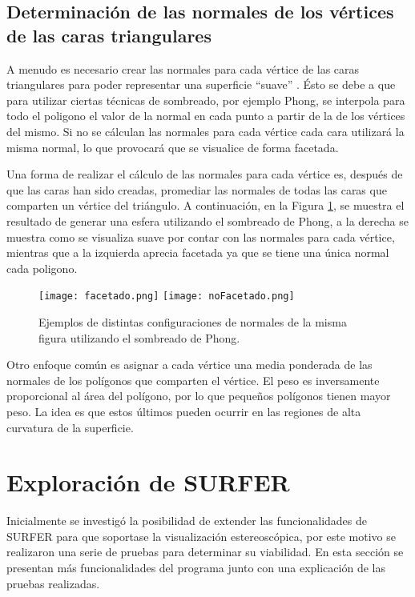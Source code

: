 \documentclass[12pt]{article}
\begin{document}
\subsection{Determinación de las normales de los vértices de las caras triangulares}
A menudo es necesario crear las normales para cada vértice de las caras triangulares para poder representar una superficie “suave” \cite{realtimerendering}. Ésto se debe a que para utilizar ciertas técnicas de sombreado, por ejemplo Phong, se interpola para todo el poligono el valor de la normal en cada punto a partir de la de los vértices del mismo. Si no se cálculan las normales para cada vértice cada cara utilizará la misma normal, lo que provocará que se visualice de forma facetada.

Una forma de realizar el cálculo de las normales para cada vértice es, después de que las caras han sido creadas, promediar las normales de todas las caras que comparten un vértice del triángulo. A continuación, en la Figura \ref{normales}, se muestra el resultado de generar una esfera utilizando el sombreado de Phong\cite{realtimerendering}, a la derecha se muestra como se visualiza suave por contar con las normales para cada vértice, mientras que a la izquierda aprecia facetada ya que se tiene una única normal cada poligono.
\begin{figure}[h]
\texttt{[image: facetado.png]}
\hfill
\texttt{[image: noFacetado.png]}
\caption{ Ejemplos de distintas configuraciones de normales de la misma figura utilizando el sombreado de Phong.}
\label{normales}
\end{figure}

Otro enfoque común es asignar a cada vértice una media ponderada de las normales de los polígonos que comparten el vértice. El peso es  inversamente proporcional al área del polígono, por lo que pequeños polígonos tienen mayor peso. La idea es que estos últimos pueden ocurrir en las regiones de alta curvatura de la superficie.

\clearpage
\section{Exploración de SURFER}
Inicialmente se investigó la posibilidad de extender las funcionalidades de SURFER para que soportase la visualización estereoscópica, por este motivo se realizaron una serie de pruebas para determinar su viabilidad. En esta sección se presentan más funcionalidades del programa junto con una explicación de las pruebas realizadas.
\end{document}
